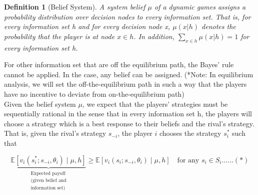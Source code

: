 \documentclass[twoside]{article}
\theoremstyle{definitionstyle}
\newtheorem*{definition}{Definition}
\begin{document}
\begin{definition}[Belief System]
    A system belief $\mu$ of a dynamic games assigns a probability distribution over 
decision nodes to every information set. That is, for every information set h and for every decision node x, $\mu (x|h)$ denotes the probability that the player is at node $x \in h$. In addition, $\sum_{x\in h}\mu(x|h) = 1$ for every information set h. 
\end{definition}
For other information set that are off the equilibrium path, the Bayes' rule cannot be applied. In the case, any belief can be assigned. (*Note: In equilibrium analysis, we will set the off-the-equilibrium path in such a way that the players have no incentive to deviate from on-the-equilibrium path)\\
Given the belief system $\mu$, we expect that the players' strategies must be sequentially rational in the sense that in every information set h, the players will choose a strategy which is a best response to their beliefs and the rival's strategy. 
That is, given the rival’s strategy $s_{-i}$, the player $i$ chooses the strategy $s_i^*$ such that

$$\underbrace{\mathbb{E}[ v_i( s_i^*; s_{-i} , \theta_i ) \mid \mu , h ]}_{\substack{\text{Expected payoff} \\ \text{(given belief and} \\ \text{information set})}} \ge \mathbb{E}[v_i(s_i; s_{-i}, \theta_i) \mid \mu, h] \quad \text{for any } s_i \in S_i \dots \dots (*)$$
\end{document}
